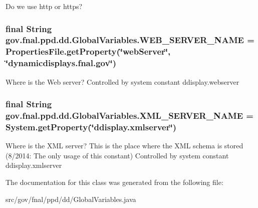 Do we use http or https? \hypertarget{classgov_1_1fnal_1_1ppd_1_1dd_1_1GlobalVariables_af5ffb15826513fabba402ec017edbc70}{
\subsubsection[{W\-E\-B\-\_\-\-S\-E\-R\-V\-E\-R\-\_\-\-N\-A\-M\-E}]{\setlength{\rightskip}{0pt plus 5cm}final String gov.\-fnal.\-ppd.\-dd.\-Global\-Variables.\-W\-E\-B\-\_\-\-S\-E\-R\-V\-E\-R\-\_\-\-N\-A\-M\-E = Properties\-File.\-get\-Property(\char`\"{}web\-Server\char`\"{}, \char`\"{}dynamicdisplays.\-fnal.\-gov\char`\"{})\hspace{0.3cm}{\ttfamily [static]}}}\label{classgov_1_1fnal_1_1ppd_1_1dd_1_1GlobalVariables_af5ffb15826513fabba402ec017edbc70}
Where is the Web server? Controlled by system constant ddisplay.\-webserver \hypertarget{classgov_1_1fnal_1_1ppd_1_1dd_1_1GlobalVariables_a1b1eb1c9096380d09b968cd474e8bb86}{
\subsubsection[{X\-M\-L\-\_\-\-S\-E\-R\-V\-E\-R\-\_\-\-N\-A\-M\-E}]{\setlength{\rightskip}{0pt plus 5cm}final String gov.\-fnal.\-ppd.\-dd.\-Global\-Variables.\-X\-M\-L\-\_\-\-S\-E\-R\-V\-E\-R\-\_\-\-N\-A\-M\-E = System.\-get\-Property(\char`\"{}ddisplay.\-xmlserver\char`\"{})\hspace{0.3cm}{\ttfamily [static]}}}\label{classgov_1_1fnal_1_1ppd_1_1dd_1_1GlobalVariables_a1b1eb1c9096380d09b968cd474e8bb86}
Where is the X\-M\-L server? This is the place where the X\-M\-L schema is stored (8/2014\-: The only usage of this constant) Controlled by system constant ddisplay.\-xmlserver 

The documentation for this class was generated from the following file\-:\begin{DoxyCompactItemize}
\item 
src/gov/fnal/ppd/dd/Global\-Variables.\-java\end{DoxyCompactItemize}
